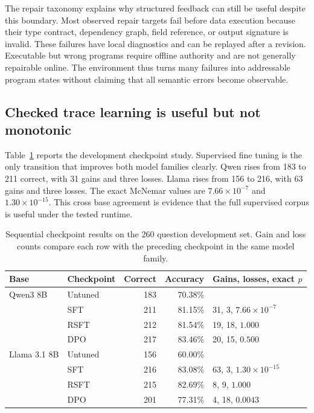 \documentclass{article}
\begin{document}
The repair taxonomy explains why structured feedback can still be useful despite this boundary.
Most observed repair targets fail before data execution because their type contract, dependency
graph, field reference, or output signature is invalid.  These failures have local diagnostics and
can be replayed after a revision.  Executable but wrong programs require offline authority and are
not generally repairable online.  The environment thus turns many failures into addressable program
states without claiming that all semantic errors become observable.

\subsection{Checked trace learning is useful but not monotonic}

Table~\ref{tab:checkpoints} reports the development checkpoint study.  Supervised fine tuning is
the only transition that improves both model families clearly.  Qwen rises from 183 to 211 correct,
with 31 gains and three losses.  Llama rises from 156 to 216, with 63 gains and three losses.  The
exact McNemar values are $7.66\times10^{-7}$ and $1.30\times10^{-15}$.  This cross base agreement
is evidence that the full supervised corpus is useful under the tested runtime.

\begin{table}[t]
  \centering
  \caption{Sequential checkpoint results on the 260 question development set.  Gain and loss
  counts compare each row with the preceding checkpoint in the same model family.}
  \label{tab:checkpoints}
  \small
  \begin{tabular}{llrrl}
    \toprule
    Base & Checkpoint & Correct & Accuracy & Gains, losses, exact $p$ \\
    \midrule
    Qwen3 8B & Untuned & 183 & 70.38\% & \\
              & SFT & 211 & 81.15\% & 31, 3, $7.66\times10^{-7}$ \\
              & RSFT & 212 & 81.54\% & 19, 18, $1.000$ \\
              & DPO & 217 & 83.46\% & 20, 15, $0.500$ \\
    \midrule
    Llama 3.1 8B & Untuned & 156 & 60.00\% & \\
              & SFT & 216 & 83.08\% & 63, 3, $1.30\times10^{-15}$ \\
              & RSFT & 215 & 82.69\% & 8, 9, $1.000$ \\
              & DPO & 201 & 77.31\% & 4, 18, $0.0043$ \\
    \bottomrule
  \end{tabular}
\end{table}
\end{document}

